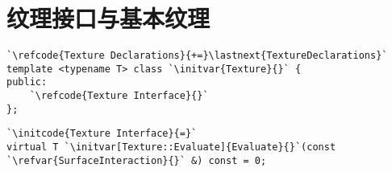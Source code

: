\section{纹理接口与基本纹理}\label{sec:纹理接口与基本纹理}

\begin{lstlisting}
`\refcode{Texture Declarations}{+=}\lastnext{TextureDeclarations}`
template <typename T> class `\initvar{Texture}{}` {
public:
    `\refcode{Texture Interface}{}`
};
\end{lstlisting}

\begin{lstlisting}
`\initcode{Texture Interface}{=}`
virtual T `\initvar[Texture::Evaluate]{Evaluate}{}`(const `\refvar{SurfaceInteraction}{}` &) const = 0;
\end{lstlisting}